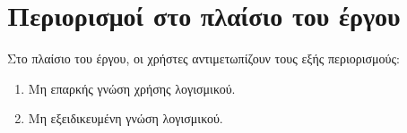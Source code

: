 \section{Περιορισμοί στο πλαίσιο του έργου}

Στο πλαίσιο του έργου, οι χρήστες αντιμετωπίζουν τους εξής περιορισμούς:
\begin{enumerate}
	\item Μη επαρκής γνώση χρήσης λογισμικού.
	\item Μη εξειδικευμένη γνώση λογισμικού.	
\end{enumerate}